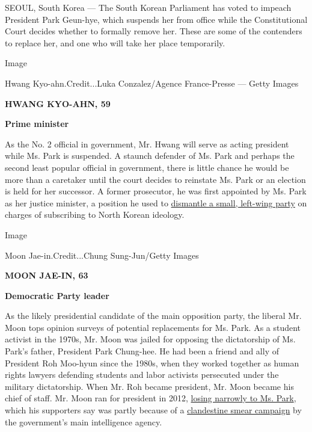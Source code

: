 SEOUL, South Korea --- The South Korean Parliament has voted to impeach
President Park Geun-hye, which suspends her from office while the
Constitutional Court decides whether to formally remove her. These are
some of the contenders to replace her, and one who will take her place
temporarily.

Image

Hwang Kyo-ahn.Credit...Luka Conzalez/Agence France-Presse --- Getty
Images

\textbf{HWANG KYO-AHN, 59}

\textbf{Prime minister}

As the No. 2 official in government, Mr. Hwang will serve as acting
president while Ms. Park is suspended. A staunch defender of Ms. Park
and perhaps the second least popular official in government, there is
little chance he would be more than a caretaker until the court decides
to reinstate Ms. Park or an election is held for her successor. A former
prosecutor, he was first appointed by Ms. Park as her justice minister,
a position he used to
\href{https://www.nytimes.com/2014/12/20/world/asia/south-korea-disbands-united-progressive-party-sympathetic-to-north-korea.html}{dismantle
a small, left-wing party} on charges of subscribing to North Korean
ideology.

Image

Moon Jae-in.Credit...Chung Sung-Jun/Getty Images

\textbf{MOON JAE-IN, 63}

\textbf{Democratic Party leader}

As the likely presidential candidate of the main opposition party, the
liberal Mr. Moon tops opinion surveys of potential replacements for Ms.
Park. As a student activist in the 1970s, Mr. Moon was jailed for
opposing the dictatorship of Ms. Park's father, President Park
Chung-hee. He had been a friend and ally of President Roh Moo-hyun since
the 1980s, when they worked together as human rights lawyers defending
students and labor activists persecuted under the military dictatorship.
When Mr. Roh became president, Mr. Moon became his chief of staff. Mr.
Moon ran for president in 2012,
\href{http://www.nytimes.com/2012/12/20/world/asia/south-koreans-vote-in-closely-fought-presidential-race.html}{losing
narrowly to Ms. Park}, which his supporters say was partly because of a
\href{http://www.nytimes.com/2015/02/10/world/asia/former-spy-chief-in-south-korea-sentenced-in-election-case.html}{clandestine
smear campaign} by the government's main intelligence agency.

